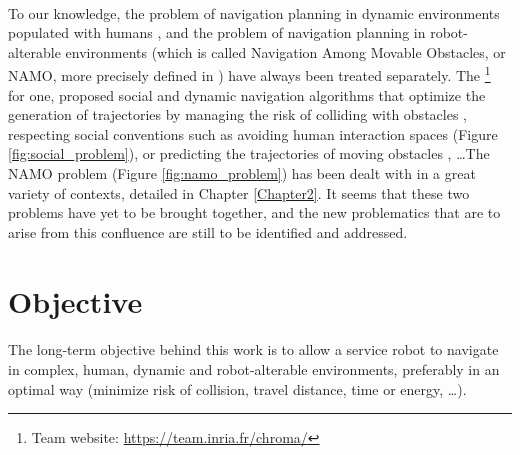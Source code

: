 \paragraph{} To our knowledge, the problem of navigation planning in dynamic environments populated with humans \parencite{kruse_human-aware_2013, rios-martinez_proxemics_2015}, and the problem of navigation planning in robot-alterable environments (which is called Navigation Among Movable Obstacles, or NAMO, more precisely defined in \parencite{stilman_navigation_2007}) have always been treated separately. The \groupname \footnote{Team website: \url{https://team.inria.fr/chroma/}} \, for one, proposed social and dynamic navigation algorithms that optimize the generation of trajectories by managing the risk of colliding with obstacles \parencite{fulgenzi_autonomous_2009, rios-martinez_socially-aware_2013}, respecting social conventions such as avoiding human interaction spaces \parencite{papadakis_adaptive_2014, rios-martinez_understanding_2011} (Figure \ref{fig:social_problem}), or predicting the trajectories of moving obstacles \parencite{jumel_mapping_2017}, \dots The NAMO problem (Figure \ref{fig:namo_problem}) has been dealt with in a great variety of contexts, detailed in Chapter \ref{Chapter2}. It seems that these two problems have yet to be brought together, and the new problematics that are to arise from this confluence are still to be identified and addressed.

\section{Objective}

\paragraph{} The long-term objective behind this work is to allow a service robot to navigate in complex, human, dynamic and robot-alterable environments, preferably in an optimal way (minimize risk of collision, travel distance, time or energy, \dots).

